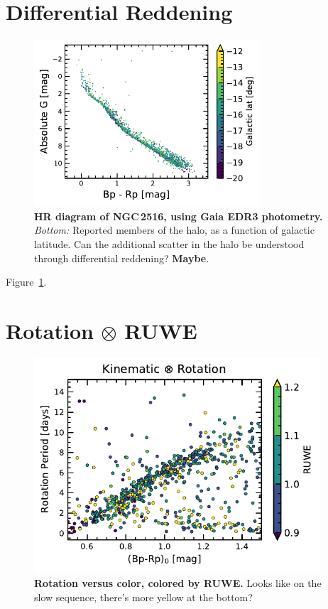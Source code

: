 \documentclass[12pt,twocolumn,tighten]{aastex63}
\begin{document}
\section{Differential Reddening}
\label{app:diffred}

\begin{figure}[t]
	\begin{center}
		\leavevmode
			\includegraphics[width=0.75\textwidth]{f2b.pdf}
	\end{center}
	\vspace{-0.7cm}
  \caption{ {\bf HR diagram of NGC\,2516, using Gaia EDR3 photometry.}
    {\it Bottom:} Reported members of the halo, as a function of
    galactic latitude. Can the additional scatter in the halo be
    understood through differential reddening?
    {\bf Maybe}.
    \label{fig:diffred}
  }
\end{figure}

Figure~\ref{fig:diffred}.


\section{Rotation $\otimes$ RUWE}
\label{app:ruwe}

\begin{figure}[t]
	\begin{center}
		\leavevmode
		\includegraphics[width=0.95\textwidth]{f6.pdf}
	\end{center}
	\vspace{-0.7cm}
	\caption{ {\bf Rotation versus color, colored by RUWE.}
		Looks like on the slow sequence, there's more yellow at the bottom?
		\label{fig:rotn_X_RUWE}
	}
\end{figure}
\end{document}
